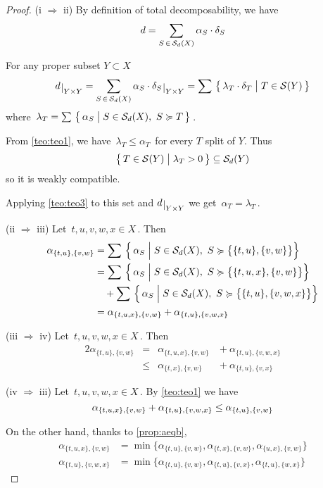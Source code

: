 \documentclass[./main.tex]{subfiles}
\begin{document}
\begin{proof}
    (i $\Rightarrow$ ii) By definition of total decomposability, we have
    \[ d = \sum_{S \,\in\, {\mathcal{S}}_d(X)} \alpha_S \cdot \delta_S \]

    For any proper subset $Y \subset X$
    \[ \restr{d}{\YY} = \sum_{S \,\in\, \Sc_d(X)} \alpha_S \cdot \restr{\delta_S}{\YY} = \sum\ \bigl\{\, \lambda_T \cdot \delta_T \mathrel{\big|} T \in \Sc(Y) \,\bigr\} \]
    where $\, \lambda_T = \sum\ \bigl\{\, \alpha_S \mathrel{\big|} S \in {\mathcal{S}}_d(X),\ S \succcurlyeq T \,\bigr\} \,$.

    From \autoref{teo:teo1}, we have $\, \lambda_T \leq \alpha_T \,$ for every $T$ split of $Y$. Thus
    \[ \bigl\{\, T \in {\mathcal{S}}(Y) \mathrel{\big|} \lambda_T > 0 \,\bigr\} \subseteq {\mathcal{S}}_d(Y) \]
    so it is weakly compatible.
    
    Applying \autoref{teo:teo3} to this set and $\restr{d}{\YY}$ we get $\, \alpha_T = \lambda_T \,$. \bigskip \bigskip

    (ii $\Rightarrow$ iii) Let $\, t,u,v,w,x \in X \,$. Then
    \begin{align*}
        \alpha_{\{t,u\},\{v,w\}} &= \sum\ \Bigl\{\, \alpha_S \mathrel{\Big|} S \in \Sc_d(X),\ S \succcurlyeq \bigl\{ \{t,u\},\{v,w\} \bigr\} \Bigr\} \\
        &= \sum\ \Bigl\{\, \alpha_S \mathrel{\Big|} S \in \Sc_d(X),\ S \succcurlyeq \bigl\{ \{t,u,x\},\{v,w\} \bigr\} \Bigr\} \\
        &\quad + \sum\ \Bigl\{\, \alpha_S \mathrel{\Big|} S \in \Sc_d(X),\ S \succcurlyeq \bigl\{ \{t,u\},\{v,w,x\} \bigr\} \Bigr\} \\
        &= \alpha_{\{t,u,x\},\{v,w\}} + \alpha_{\{t,u\},\{v,w,x\}}
    \end{align*} \bigskip

    (iii $\Rightarrow$ iv) Let $\, t,u,v,w,x \in X \,$. Then
    \begin{alignat*}{2}
        \alpha_{\{t,u\},\{v,w\}} &{}={}& \alpha_{\{t,u,x\},\{v,w\}} &{}+{} \alpha_{\{t,u\},\{v,w,x\}} \\
        &\leq{}& \alpha_{\{t,x\},\{v,w\}} &{}+{} \alpha_{\{t,u\},\{v,x\}}
    \end{alignat*} \bigskip

    (iv $\Rightarrow$ iii) Let $\, t,u,v,w,x \in X \,$. By \autoref{teo:teo1} we have
    \[ \alpha_{\{t,u,x\},\{v,w\}} + \alpha_{\{t,u\},\{v,w,x\}} \leq \alpha_{\{t,u\},\{v,w\}} \eqspace{0pt}{\bigskipamount} \]

    On the other hand, thanks to \autoref{prop:aeqb},
    \begin{align*}
        \alpha_{\{t,u,x\},\{v,w\}} &= \min \bigl\{ \alpha_{\{t,u\},\{v,w\}}, \alpha_{\{t,x\},\{v,w\}}, \alpha_{\{u,x\},\{v,w\}} \bigr\} \\
        \alpha_{\{t,u\},\{v,w,x\}} &= \min \bigl\{ \alpha_{\{t,u\},\{v,w\}}, \alpha_{\{t,u\},\{v,x\}}, \alpha_{\{t,u\},\{w,x\}} \bigr\} 
    \end{align*}


\end{proof}
\end{document}
